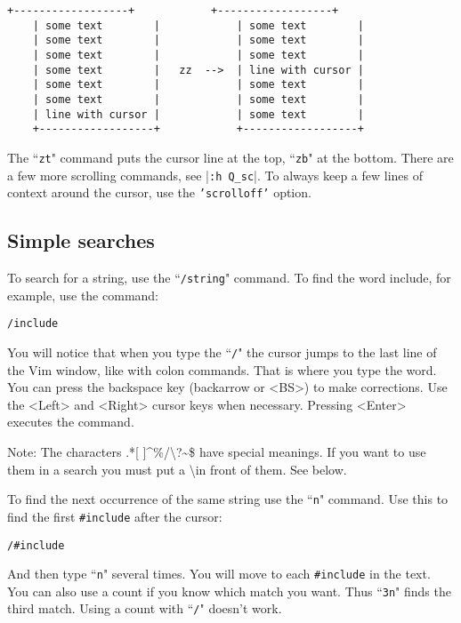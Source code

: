 \begin{Verbatim}[samepage=true]
    +------------------+            +------------------+
    | some text        |            | some text        |
    | some text        |            | some text        |
    | some text        |            | some text        |
    | some text        |   zz  -->  | line with cursor |
    | some text        |            | some text        |
    | some text        |            | some text        |
    | line with cursor |            | some text        |
    +------------------+            +------------------+
\end{Verbatim}

The ``\texttt{zt}" command puts the cursor line at the top, ``\texttt{zb}" at the bottom.
There are a few more scrolling commands, see |\texttt{:h Q\_sc}|.
To always keep a few lines of context around the cursor, use the \texttt{'scrolloff'} option.

\subsection{Simple searches}

To search for a string, use the ``\texttt{/string}" command.
To find the word include, for example, use the command:

 \begin{Verbatim}[samepage=true]
 /include
 \end{Verbatim}

You will notice that when you type the ``\texttt{/}" the cursor jumps to the last line of the Vim window, like with colon commands.
That is where you type the word.
You can press the backspace key (backarrow or <BS>) to make corrections.
Use the <Left> and <Right> cursor keys when necessary.
Pressing <Enter> executes the command.

Note:
The characters .*[ ]\textasciicircum\%/\textbackslash?\textasciitilde\$ have special meanings.
If you want to use them in a search you must put a \textbackslash in front of them.
See below.

To find the next occurrence of the same string use the ``\texttt{n}" command.
Use this to find the first \texttt{\#include} after the cursor:

 \begin{Verbatim}[samepage=true]
 /#include
 \end{Verbatim}

And then type ``\texttt{n}" several times.
You will move to each \texttt{\#include} in the text.
You can also use a count if you know which match you want.
Thus ``\texttt{3n}" finds the third match.
Using a count with ``\texttt{/}" doesn't work.

